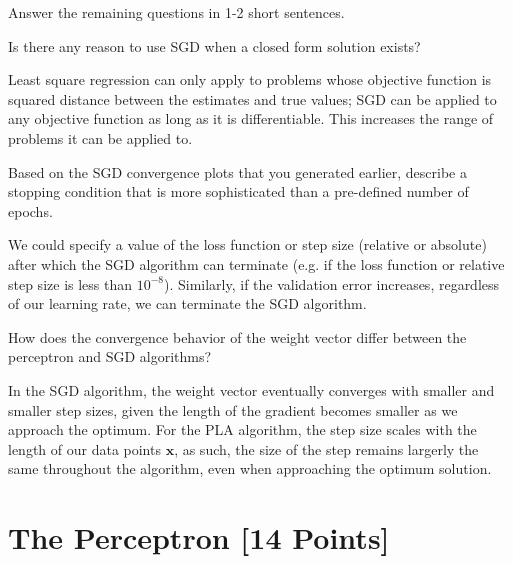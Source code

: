 Answer the remaining questions in 1-2 short sentences.

\begin{problem}[2]
  Is there any reason to use SGD when a closed form solution exists?
\end{problem}
\begin{solution}
  Least square regression can only apply to problems whose objective function is squared distance between the estimates and true values; SGD can be applied to any objective function as long as it is differentiable. This increases the range of problems it can be applied to.
\end{solution}

\begin{problem}[2]
  Based on the SGD convergence plots that you generated earlier, describe a stopping condition that is more sophisticated than a pre-defined number of epochs.
\end{problem}
\begin{solution}
  We could specify a value of the loss function or step size (relative or absolute) after which the SGD algorithm can terminate (e.g. if the loss function or relative step size is less than $10^{-8}$). Similarly, if the validation error increases, regardless of our learning rate, we can terminate the SGD algorithm.
\end{solution}

\begin{problem}[2]
How does the convergence behavior of the weight vector differ between the perceptron and SGD algorithms?
\end{problem}
\begin{solution}
  In the SGD algorithm, the weight vector eventually converges with smaller and smaller step sizes, given the length of the gradient becomes smaller as we approach the optimum. For the PLA algorithm, the step size scales with the length of our data points $\mathbf{x}$, as such, the size of the step remains largerly the same throughout the algorithm, even when approaching the optimum solution.
\end{solution}





\newpage
\section{The Perceptron [14 Points]}


